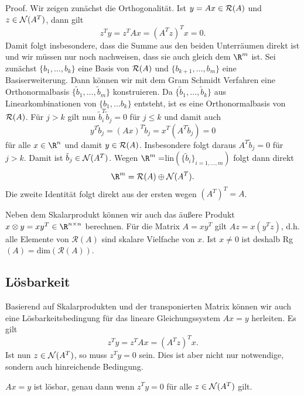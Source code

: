 \documentclass[letterpaper,10pt,english]{jupyterBook}
\begin{document}
\begin{emphBox}{}{}
Proof. Wir zeigen zunächst die Orthogonalität. Ist \(y=Ax \in {\cal R}(A)\) und \(z \in {\cal N}(A^T)\), dann gilt
\begin{equation*}
 z^T y = z^T A x = (A^T z)^T x = 0.
\end{equation*}
Damit folgt insbesondere, dass die Summe aus den beiden Unterräumen direkt ist und wir müssen nur noch nachweisen, dass sie auch gleich dem \(\R^m\) ist. Sei zunächst \(\{b_1,\ldots,b_k\}\) eine Basis von \({\cal R}(A)\) und \(\{b_{k+1},\ldots,b_m\}\) eine Basiserweiterung. Dann können wir mit dem Gram Schmidt Verfahren eine Orthonormalbasis  \(\{\tilde b_1,\ldots, \tilde b_m\}\)
konstruieren. Da \(\{\tilde b_1, \ldots, \tilde b_k\}\) aus Linearkombinationen von \(\{b_1, \ldots b_k\}\) entsteht, ist es eine Orthonormalbasis von \({\cal R}(A)\). Für \(j > k\) gilt nun \(\tilde b_i^T \tilde b_j = 0\) für \(j \leq k\) und damit auch
\begin{equation*}
 y^T \tilde b_j = (Ax)^T \tilde b_j = x^T (A^T \tilde b_j) = 0
\end{equation*}
für alle \(x \in \R^n\) und damit \(y \in {\cal R}(A)\). Insbesondere folgt daraus \(A^T \tilde b_j = 0\) für \(j > k\). Damit ist \(\tilde b_j \in {\cal N}(A^T)\). Wegen \(\R^m  = \)lin\((\{\tilde b_i\}_{i=1,\ldots,m})\) folgt dann direkt
\begin{equation*}
 \R^m  = {\cal R}(A) \oplus {\cal N}(A^T).
\end{equation*}
Die zweite Identität folgt direkt aus der ersten wegen \((A^T)^T = A\).
\end{emphBox}

Neben dem Skalarprodukt können wir auch das äußere Produkt \(x \otimes y = x y^T \in \R^{n \times n}\) berechnen. Für die Matrix \(A=x y^T\) gilt \(A z = x(y^T z)\), d.h. alle Elemente von \({\mathcal R}(A)\) sind skalare Vielfache von \(x\). Ist \(x \neq 0\) ist deshalb Rg\((A) = \)dim\(({\mathcal R}(A))\).


\subsection{Lösbarkeit}
\label{\detokenize{vektorraeume/LGS:losbarkeit}}
Basierend auf Skalarprodukten und der transponierten Matrix können wir auch eine Lösbarkeitsbedingung für das lineare Gleichungssystem \(A x = y\) herleiten. Es gilt
\begin{equation*}
 z^T y = z^T A x = (A^T z)^T x.
\end{equation*}
Ist nun \(z \in {\cal N}(A^T)\), so muss \(z^T y = 0\) sein. Dies ist aber nicht nur notwendige, sondern auch hinreichende Bedingung.
\label{vektorraeume/LGS:theorem-6}
\begin{theorem}{}{}



\(Ax=y\) ist lösbar, genau dann wenn \(z^T y = 0\) für alle \(z \in {\cal N}(A^T)\) gilt.
\end{theorem}
\end{document}
